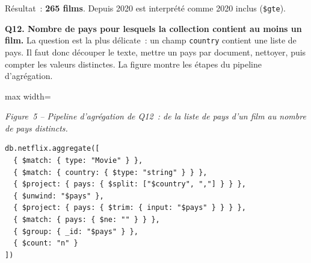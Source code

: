 \noindent Résultat~: \textbf{265 films}. \og Depuis 2020 \fg{} est interprété comme 2020 inclus (\texttt{\$gte}).

\medskip
{}
\noindent \textbf{Q12. Nombre de pays pour lesquels la collection contient au moins un film.} La question est la plus délicate~: un champ \texttt{country} contient une liste de pays. Il faut donc découper le texte, mettre un pays par document, nettoyer, puis compter les valeurs distinctes. La figure montre les étapes du pipeline d'agrégation.

\begin{center}
\begin{adjustbox}{max width=\linewidth}
\end{adjustbox}\par\nobreak\smallskip
\small\textit{Figure~5 -- Pipeline d'agrégation de Q12~: de la liste de pays d'un film au nombre de pays distincts.}
\end{center}

\begin{verbatim}
db.netflix.aggregate([
  { $match: { type: "Movie" } },
  { $match: { country: { $type: "string" } } },
  { $project: { pays: { $split: ["$country", ","] } } },
  { $unwind: "$pays" },
  { $project: { pays: { $trim: { input: "$pays" } } } },
  { $match: { pays: { $ne: "" } } },
  { $group: { _id: "$pays" } },
  { $count: "n" }
])
\end{verbatim}

